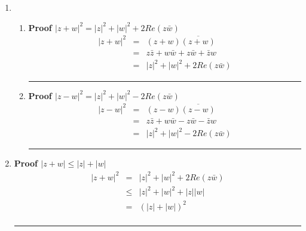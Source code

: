 \documentclass{article}%
\newcommand\abs[1]{\left|#1\right|}
\newenvironment{proof}[1][]{\begin{samepage}\textbf{Proof #1} }{\rule{0.5em}{0.5em} \end{samepage}}
\begin{document}
\begin{enumerate}
\begin{enumerate}[label*=\arabic*.]
\begin{proof}[$\abs{z \cdot w} \leq \abs{z}\abs{w}$]
\begin{eqnarray*}
                \abs{Im(z)} &\leq& \abs{z} \\
                \abs{z \cdot w} &=& \abs{Re(z\bar{w})} \\
                              &\leq& \abs{z \bar{w}} \\
                              &=& \abs{z}\abs{w}
            \end{eqnarray*}
        \end{proof}
        \item %
        \begin{enumerate}[label=\alph*]
            \item %
            \begin{proof}[$\abs{z+w}^2 = \abs{z}^2 + \abs{w}^2 + 2 Re(z\bar{w})$]
                \begin{eqnarray*}
                    \abs{z+w}^2 &=& (z+w)\overline{(z+w)} \\
                                &=& z \bar{z} + w \bar{w} + z\bar{w} + \bar{z} w \\
                                &=& \abs{z}^2 + \abs{w}^2 + 2 Re(z\bar{w}) 
                \end{eqnarray*}
            \end{proof}
            \item %
            \begin{proof}[$\abs{z-w}^2 = \abs{z}^2 + \abs{w}^2 - 2 Re(z\bar{w})$]
                \begin{eqnarray*}
                    \abs{z-w}^2 &=& (z-w)\overline{(z-w)} \\
                                &=& z \bar{z} + w \bar{w} - z\bar{w} - \bar{z} w \\
                                &=& \abs{z}^2 + \abs{w}^2 - 2 Re(z\bar{w}) 
                \end{eqnarray*}
            \end{proof}
        \end{enumerate}
        \item %
        \begin{proof}[$\abs{z+w}\leq\abs{z}+\abs{w}$]
            \begin{eqnarray*}
                \abs{z+w}^2 &=& \abs{z}^2 + \abs{w}^2 + 2 Re(z\bar{w}) \\
                            &\leq& \abs{z}^2 + \abs{w}^2 + \abs{z}\abs{w} \\
                            &=& (\abs{z}+\abs{w})^2 \\

\end{eqnarray*}
\end{proof}
\end{enumerate}
\end{enumerate}
\end{document}
